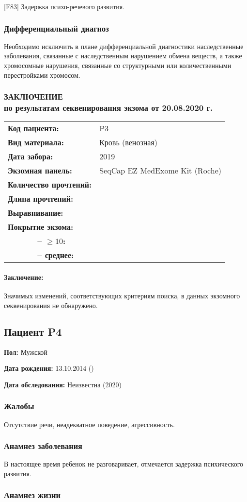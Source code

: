 \documentclass[a4paper,14pt]{extarticle}
\newcommand{\reportgen}[9]{
\begin{tabular}{ >{\bfseries}p{0.35\textwidth} l }
Код пациента: & #1 \\
Вид материала: & #2 \\
Дата забора: & #3 \\
Экзомная панель: & #4 \\
Количество прочтений: & \numprint[\mln]{#5} \\
Длина прочтений: & \numprint[bp]{#6} \\
Выравнивание: & \numprint[\%]{#7} \\
Покрытие экзома: & ~ \\
~~~~~~ -- $\geqslant10$: & \numprint[\%]{#8} \\
~~~~~~ -- среднее: & \numprint[прочтений/позицию]{#9} \\
\end{tabular}}
\newcommand{\mln}{млн}
\newcommand{\DS}[2]{[#2] #1}
\begin{document}
\DS{Задержка психо-речевого развития}{F83}.

\subsubsection*{Дифференциальный диагноз}

Необходимо исключить в плане дифференциальной диагностики наследственные заболевания, связанные  с наследственным нарушением обмена веществ, а также хромосомные нарушения, связанные со структурными или количественными перестройками хромосом.

\newpage
\subsubsection*{ЗАКЛЮЧЕНИЕ\\по результатам секвенирования экзома от 20.08.2020 г.}

\reportgen{P3}{Кровь (венозная)}{2019}{SeqCap EZ MedExome Kit (Roche)}{---}{150}{---}{---}{---}

\paragraph{Заключение:} Значимых изменений, соответствующих критериям поиска, в данных экзомного секвенирования не обнаружено.

\newpage
\subsection*{Пациент P4}

\textbf{Пол:} Мужской

\textbf{Дата рождения:} 13.10.2014 ()

\textbf{Дата обследования:} Неизвестна (2020) 

\subsubsection*{Жалобы}

Отсутствие речи, неадекватное поведение, агрессивность.

\subsubsection*{Анамнез заболевания}

В настоящее время ребенок не разговаривает, отмечается задержка психического развития.

\subsubsection*{Анамнез жизни}
\end{document}
